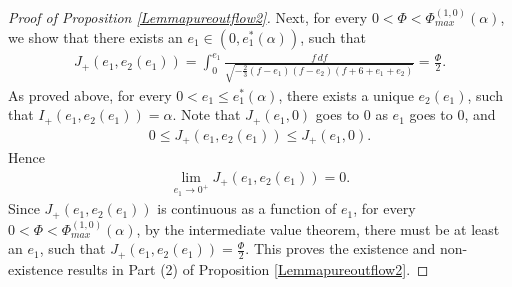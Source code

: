 \documentclass[reqno,12pt]{amsart}
\begin{document}
\begin{proof} [Proof of Proposition \ref{Lemmapureoutflow2}]
Next, for every $0<\Phi < \Phi_{max}^{(1, 0)}(\alpha)$, we show that there exists an $e_1\in (0, e_1^*(\alpha))$, such that 
\begin{align}\nonumber
    J_{+}(e_1, e_2(e_1)) = \int_0^{e_1} \frac{f \,df }{\sqrt{-\frac23 (f-e_1) (f - e_2) (f+6+e_1 + e_2)}}  = \frac{\Phi}{2}. 
\end{align}
As proved above, for every $0< e_1 \leq e_1^*(\alpha)$, there exists a unique  $e_2(e_1)$, such that $I_{+}(e_1, e_2(e_1)) = \alpha$. Note that  $J_{+}(e_1, 0)$ goes to $0$ as $e_1$ goes to $0$, and
\begin{align}\nonumber
   0\leq  J_{+}(e_1, e_2(e_1)) \leq J_{+}(e_1, 0).
\end{align}
Hence
\begin{align}\nonumber
    \lim_{e_1 \rightarrow 0^+} J_{+}(e_1, e_2(e_1)) = 0. 
\end{align}
Since $J_{+}(e_1, e_2(e_1))$ is continuous as a function of $e_1$, for every $0<\Phi < \Phi_{max}^{(1, 0)}(\alpha)$, by the intermediate value theorem, there must be at least an $e_1$, such that 
$ J_{+}(e_1, e_2(e_1)) = \frac{\Phi}{2}. $
This proves the existence and non-existence results in Part (2) of Proposition \ref{Lemmapureoutflow2}.


\end{proof}
\end{document}
